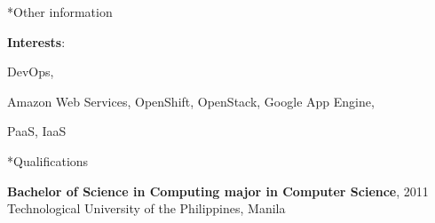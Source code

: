 \documentclass[10pt, a4paper, final]{article}
\begin{document}
\begin{section}*{Other information}
  \begin{inparadesc}
    \item \textbf{Interests}:
    \item DevOps,
    \item Amazon Web Services, OpenShift, OpenStack, Google App Engine,
    \item PaaS, IaaS
  \end{inparadesc}
  \vspace{1em}
  \begin{subsection}*{Qualifications}
    \begin{compactitem}
      \vspace{0.25em}
      \item \textbf{Bachelor of Science in Computing major in Computer Science}, \textsc{2011}\\
      Technological University of the Philippines, Manila
      \vspace{0.25em}
      

\end{compactitem}
\end{subsection}
\end{section}
\end{document}
